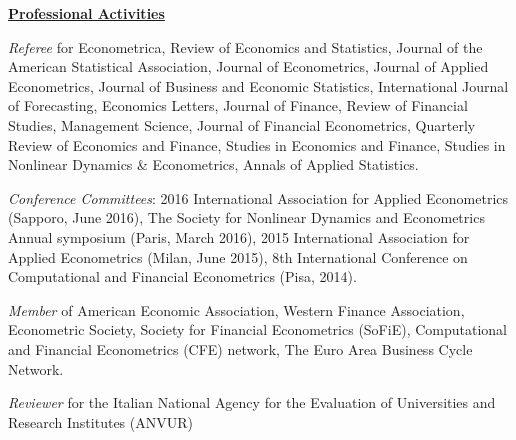 \documentclass[12pt]{article}
\begin{document}
\underline{\textbf{Professional Activities}}
\begin{description}

\item \emph{Referee} for Econometrica, Review of Economics and Statistics, Journal of the American Statistical Association, Journal of Econometrics, Journal of Applied Econometrics, Journal of Business and Economic Statistics, International Journal of Forecasting, Economics Letters, Journal of Finance, Review of Financial Studies, Management Science, Journal of Financial Econometrics, Quarterly Review of Economics and Finance, Studies in Economics and Finance, Studies in Nonlinear Dynamics \& Econometrics, Annals of Applied Statistics.

\item \emph{Conference Committees}: 2016 International Association for Applied Econometrics (Sapporo, June 2016), The Society for Nonlinear Dynamics and Econometrics Annual symposium (Paris, March 2016),  2015 International Association for Applied Econometrics (Milan, June 2015), 8th International Conference on Computational and Financial Econometrics (Pisa, 2014).

\item\emph{Member} of American Economic Association, Western Finance Association, Econometric Society, Society for Financial Econometrics (SoFiE), Computational and Financial Econometrics (CFE) network, The Euro Area Business Cycle Network.

\item \emph{Reviewer} for the Italian National Agency for the Evaluation of Universities and Research Institutes (ANVUR) 
\end{description}
 
\end{document}
